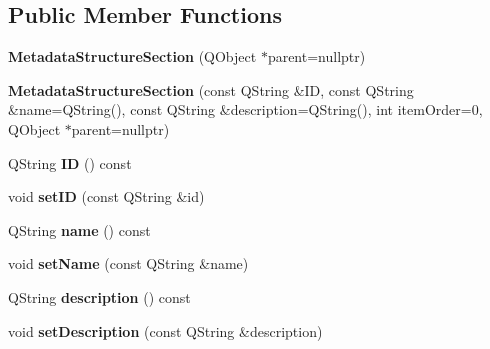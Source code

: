 \subsection*{Public Member Functions}
\begin{DoxyCompactItemize}
\item 
\mbox{\label{class_metadata_structure_section_a05979f89a40a6f1956646cb93e01c0bf}} 
{\bfseries Metadata\+Structure\+Section} (Q\+Object $\ast$parent=nullptr)
\item 
\mbox{\label{class_metadata_structure_section_a3fb654c3afbf9cb0b00e759db35a75ef}} 
{\bfseries Metadata\+Structure\+Section} (const Q\+String \&ID, const Q\+String \&name=Q\+String(), const Q\+String \&description=Q\+String(), int item\+Order=0, Q\+Object $\ast$parent=nullptr)
\item 
\mbox{\label{class_metadata_structure_section_af8c32c610057824ed02c868fd3d6c655}} 
Q\+String {\bfseries ID} () const
\item 
\mbox{\label{class_metadata_structure_section_ac11d472b73af81b0c604199810d235a5}} 
void {\bfseries set\+ID} (const Q\+String \&id)
\item 
\mbox{\label{class_metadata_structure_section_a18b5a20761a6038cf02cb284b4e60887}} 
Q\+String {\bfseries name} () const
\item 
\mbox{\label{class_metadata_structure_section_ac18cb912a09f5215a698dc653b5e6dc6}} 
void {\bfseries set\+Name} (const Q\+String \&name)
\item 
\mbox{\label{class_metadata_structure_section_acb9d8561dc03268d976ba48b92629a81}} 
Q\+String {\bfseries description} () const
\item 
\mbox{\label{class_metadata_structure_section_aeb8ba9a64961043bc562f224fc4045b1}} 
void {\bfseries set\+Description} (const Q\+String \&description)
\item 
\mbox{\label{class_metadata_structure_section_a1cd539481c6bd2e6578878adebf887eb}} 

\end{DoxyCompactItemize}
